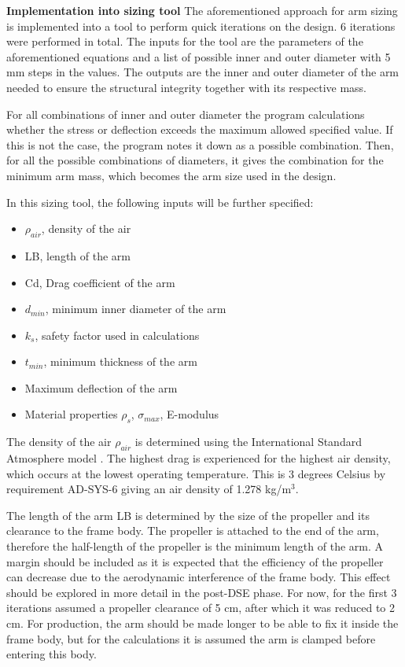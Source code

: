 \textbf{Implementation into sizing tool} \newline
The aforementioned approach for arm sizing is implemented into a tool to perform quick iterations on the design. 6 iterations were performed in total. The inputs for the tool are the parameters of the aforementioned equations and a list of possible inner and outer diameter with 5 mm steps in the values. The outputs are the inner and outer diameter of the arm needed to ensure the structural integrity together with its respective mass.

For all combinations of inner and outer diameter the program calculations whether the stress or deflection exceeds the maximum allowed specified value. If this is not the case, the program notes it down as a possible combination. Then, for all the possible combinations of diameters, it gives the combination for the minimum arm mass, which becomes the arm size used in the design.

In this sizing tool, the following inputs will be further specified:
\begin{itemize}[noitemsep,nolistsep]
    \item $\rho_{air}$, density of the air
    \item LB, length of the arm
    \item Cd, Drag coefficient of the arm
    \item $d_{min}$, minimum inner diameter of the arm
    \item $k_{s}$, safety factor used in calculations
    \item $t_{min}$, minimum thickness of the arm
    \item Maximum deflection of the arm
    \item Material properties $\rho_s$, $\sigma_{max}$, E-modulus
    
\end{itemize}

The density of the air $\rho_{air}$ is determined using the International Standard Atmosphere model \cite{ISA}. The highest drag is experienced for the highest air density, which occurs at the lowest operating temperature. This is 3 degrees Celsius by requirement AD-SYS-6 giving an air density of 1.278 kg/m$^3$.

The length of the arm LB is determined by the size of the propeller and its clearance to the frame body. The propeller is attached to the end of the arm, therefore the half-length of the propeller is the minimum length of the arm. A margin should be included as it is expected that the efficiency of the propeller can decrease due to the aerodynamic interference of the frame body. This effect should be explored in more detail in the post-DSE phase. For now, for the first 3 iterations assumed a propeller clearance of 5 cm, after which it was reduced to 2 cm. For production, the arm should be made longer to be able to fix it inside the frame body, but for the calculations it is assumed the arm is clamped before entering this body.

